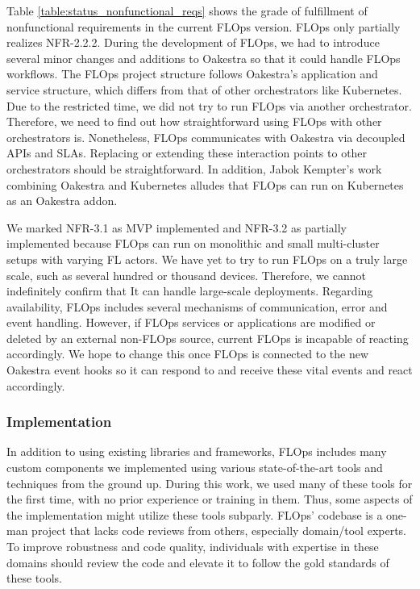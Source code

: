 Table \ref{table:status_nonfunctional_reqs} shows the grade of fulfillment of nonfunctional requirements in the current FLOps version.
FLOps only partially realizes NFR-2.2.2.
During the development of FLOps, we had to introduce several minor changes and additions to Oakestra so that it could handle FLOps workflows.
The FLOps project structure follows Oakestra's application and service structure, which differs from that of other orchestrators like Kubernetes.
Due to the restricted time, we did not try to run FLOps via another orchestrator.
Therefore, we need to find out how straightforward using FLOps with other orchestrators is.
Nonetheless, FLOps communicates with Oakestra via decoupled APIs and SLAs.
Replacing or extending these interaction points to other orchestrators should be straightforward.
In addition, Jabok Kempter's work combining Oakestra and Kubernetes \cite{thesis:tum_jakob_kempter_kubernetes_oakestra} alludes that FLOps can run on Kubernetes as an Oakestra addon.

We marked NFR-3.1 as MVP implemented and NFR-3.2 as partially implemented because FLOps can run on monolithic and small multi-cluster setups with varying FL actors.
We have yet to try to run FLOps on a truly large scale, such as several hundred or thousand devices.
Therefore, we cannot indefinitely confirm that It can handle large-scale deployments.
Regarding availability, FLOps includes several mechanisms of communication, error and event handling.
However, if FLOps services or applications are modified or deleted by an external non-FLOps source, current FLOps is incapable of reacting accordingly.
We hope to change this once FLOps is connected to the new Oakestra event hooks \cite{thesis:tum_mahmoud} so it can respond to and receive these vital events and react accordingly.


\subsubsection{Implementation}
In addition to using existing libraries and frameworks, FLOps includes many custom components we implemented using various state-of-the-art tools and techniques from the ground up.
During this work, we used many of these tools for the first time, with no prior experience or training in them.
Thus, some aspects of the implementation might utilize these tools subparly.
FLOps' codebase is a one-man project that lacks code reviews from others, especially domain/tool experts.
To improve robustness and code quality, individuals with expertise in these domains should review the code and elevate it to follow the gold standards of these tools.

